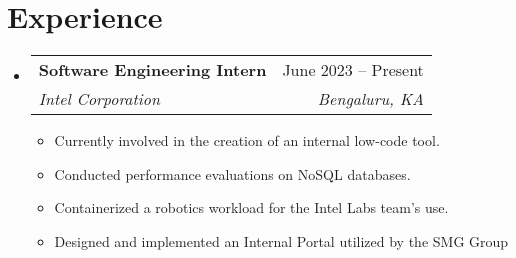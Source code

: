 \documentclass[letterpaper,11pt]{article}
\makeatletter
\newcommand{\resumeItem}[1]{
  \item\small{
    {#1 \vspace{-2pt}}
  }
}
\newcommand{\resumeSubheading}[4]{
  \vspace{-2pt}\item
    \begin{tabular*}{0.97\textwidth}[t]{l@{\extracolsep{\fill}}r}
      \textbf{#1} & #2 \\
      \textit{\small#3} & \textit{\small #4} \\
    \end{tabular*}\vspace{-7pt}
}
\newcommand{\resumeSubSubheading}[2]{
    \item
    \begin{tabular*}{0.97\textwidth}{l@{\extracolsep{\fill}}r}
      \textit{\small#1} & \textit{\small #2} \\
    \end{tabular*}\vspace{-7pt}
}
\newcommand{\resumeSubHeadingListStart}{\begin{itemize}[leftmargin=0.15in, label={}]}
\newcommand{\resumeSubHeadingListEnd}{\end{itemize}}
\newcommand{\resumeItemListStart}{\begin{itemize}}
\newcommand{\resumeItemListEnd}{\end{itemize}\vspace{-5pt}}
\makeatother
\begin{document}
\section{Experience}
  \resumeSubHeadingListStart

    \resumeSubheading
      {Software Engineering Intern}{June 2023 -- Present}
      {Intel Corporation}{Bengaluru, KA}
      \resumeItemListStart
        \resumeItem{Currently involved in the creation of an internal low-code tool.}
        \resumeItem{Conducted performance evaluations on NoSQL databases.}
        \resumeItem{Containerized a robotics workload for the Intel Labs team's use.}
        \resumeItem{Designed and implemented an Internal Portal utilized by the SMG Group}
      \resumeItemListEnd



   \resumeSubHeadingListEnd
%
\end{document}

